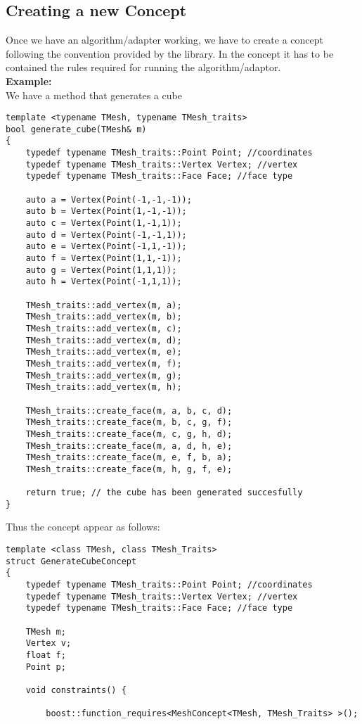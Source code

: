 \begin{appendices}
\section{Creating a new Concept}

Once we have an algorithm/adapter working, we have to create a concept following the convention
provided by the library. In the concept it has to be contained the rules required for running the
algorithm/adaptor.\\

\textbf{Example:}\\
We have a method that generates a cube
\label{app:cube}
\begin{lstlisting}
template <typename TMesh, typename TMesh_traits>
bool generate_cube(TMesh& m)
{
	typedef typename TMesh_traits::Point Point; //coordinates
	typedef typename TMesh_traits::Vertex Vertex; //vertex
	typedef typename TMesh_traits::Face Face; //face type
	
	auto a = Vertex(Point(-1,-1,-1));
	auto b = Vertex(Point(1,-1,-1));
	auto c = Vertex(Point(1,-1,1));
	auto d = Vertex(Point(-1,-1,1));
	auto e = Vertex(Point(-1,1,-1));
	auto f = Vertex(Point(1,1,-1));
	auto g = Vertex(Point(1,1,1));
	auto h = Vertex(Point(-1,1,1));
	
	TMesh_traits::add_vertex(m, a);
	TMesh_traits::add_vertex(m, b);
	TMesh_traits::add_vertex(m, c);
	TMesh_traits::add_vertex(m, d);
	TMesh_traits::add_vertex(m, e);
	TMesh_traits::add_vertex(m, f);
	TMesh_traits::add_vertex(m, g);
	TMesh_traits::add_vertex(m, h);

	TMesh_traits::create_face(m, a, b, c, d);
	TMesh_traits::create_face(m, b, c, g, f);
	TMesh_traits::create_face(m, c, g, h, d);
	TMesh_traits::create_face(m, a, d, h, e);		
	TMesh_traits::create_face(m, e, f, b, a);		
	TMesh_traits::create_face(m, h, g, f, e);
	
	return true; // the cube has been generated succesfully
}
\end{lstlisting}
Thus the concept appear as follows:

\begin{lstlisting}
template <class TMesh, class TMesh_Traits>
struct GenerateCubeConcept
{
	typedef typename TMesh_traits::Point Point; //coordinates
	typedef typename TMesh_traits::Vertex Vertex; //vertex
	typedef typename TMesh_traits::Face Face; //face type

	TMesh m;
	Vertex v;
	float f;
	Point p;

	void constraints() {

		boost::function_requires<MeshConcept<TMesh, TMesh_Traits> >();


\end{lstlisting}
\end{appendices}

